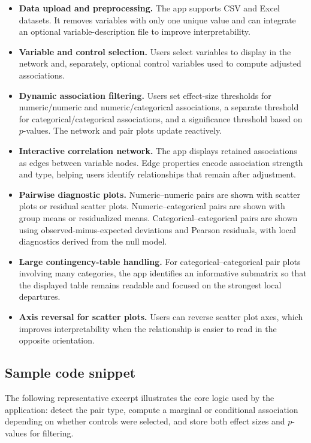 \documentclass[11pt,a4paper]{article}
\begin{document}
\begin{itemize}
\item \textbf{Data upload and preprocessing.} The app supports CSV and Excel datasets. It removes variables with only one unique value and can integrate an optional variable-description file to improve interpretability.
\item \textbf{Variable and control selection.} Users select variables to display in the network and, separately, optional control variables used to compute adjusted associations.
\item \textbf{Dynamic association filtering.} Users set effect-size thresholds for numeric/numeric and numeric/categorical associations, a separate threshold for categorical/categorical associations, and a significance threshold based on $p$-values. The network and pair plots update reactively.
\item \textbf{Interactive correlation network.} The app displays retained associations as edges between variable nodes. Edge properties encode association strength and type, helping users identify relationships that remain after adjustment.
\item \textbf{Pairwise diagnostic plots.} Numeric--numeric pairs are shown with scatter plots or residual scatter plots. Numeric--categorical pairs are shown with group means or residualized means. Categorical--categorical pairs are shown using observed-minus-expected deviations and Pearson residuals, with local diagnostics derived from the null model.
\item \textbf{Large contingency-table handling.} For categorical--categorical pair plots involving many categories, the app identifies an informative submatrix so that the displayed table remains readable and focused on the strongest local departures.
\item \textbf{Axis reversal for scatter plots.} Users can reverse scatter plot axes, which improves interpretability when the relationship is easier to read in the opposite orientation.
\end{itemize}

\subsection{Sample code snippet}

The following representative excerpt illustrates the core logic used by the application: detect the pair type, compute a marginal or conditional association depending on whether controls were selected, and store both effect sizes and $p$-values for filtering.
\end{document}
